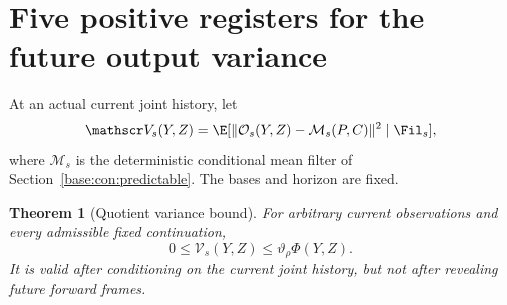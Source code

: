 \documentclass[11pt,oneside,openany,a4paper]{book}
\numberwithin{equation}{chapter}
\newtheorem{theorem}{Theorem}[chapter]
\theoremstyle{definition}
\theoremstyle{remark}
\begin{document}
\section{Five positive registers for the future output variance}\label{base:con:variance}
At an actual current joint history, let
\[
 \mathscr V_s(Y,Z)=\E[\|\mathcal O_s(Y,Z)-\mathcal M_s(P,C)\|^2\mid\Fil_s],
\]
where $\mathcal M_s$ is the deterministic conditional mean filter of Section~\ref{base:con:predictable}. The bases and horizon are fixed.

\begin{theorem}[Quotient variance bound]\label{base:con:variance-thm}
For arbitrary current observations and every admissible fixed continuation,
\begin{equation}\label{base:con:variance-main}
 0\le\mathscr V_s(Y,Z)\le\vartheta_\rho\Phi(Y,Z).
\end{equation}
It is valid after conditioning on the current joint history, but not after revealing future forward frames.
\end{theorem}
\end{document}
